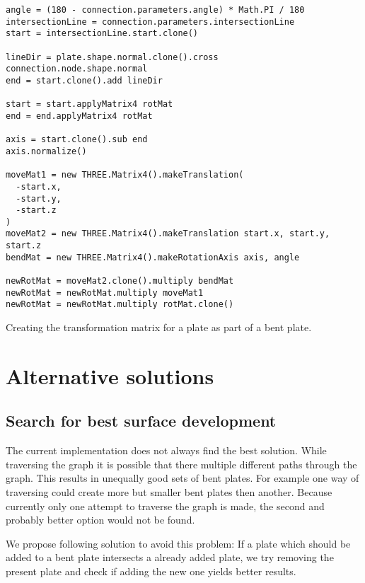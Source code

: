 \documentclass[../ClassicThesis.tex]{subfiles}
\begin{document}
\begin{listing}[ht]
\begin{verbatim}
angle = (180 - connection.parameters.angle) * Math.PI / 180
intersectionLine = connection.parameters.intersectionLine
start = intersectionLine.start.clone()

lineDir = plate.shape.normal.clone().cross connection.node.shape.normal
end = start.clone().add lineDir

start = start.applyMatrix4 rotMat
end = end.applyMatrix4 rotMat

axis = start.clone().sub end
axis.normalize()

moveMat1 = new THREE.Matrix4().makeTranslation(
  -start.x,
  -start.y,
  -start.z
)
moveMat2 = new THREE.Matrix4().makeTranslation start.x, start.y, start.z
bendMat = new THREE.Matrix4().makeRotationAxis axis, angle

newRotMat = moveMat2.clone().multiply bendMat
newRotMat = newRotMat.multiply moveMat1
newRotMat = newRotMat.multiply rotMat.clone()
\end{verbatim}
\caption{Creating the transformation matrix for a plate as part of a bent plate.}
\label{lst:bend-matrix}
\end{listing}

\section{Alternative solutions}

\subsection{Search for best surface development}

The current implementation does not always find the best solution. While traversing the graph it is possible that there multiple different paths through the graph. This results in unequally good sets of bent plates. For example one way of traversing could create more but smaller bent plates then another.
Because currently only one attempt to traverse the graph is made, the second and probably better option would not be found.

We propose following solution to avoid this problem: If a plate which should be added to a bent plate intersects a already added plate, we try removing the present plate and check if adding the new one yields better results.
\end{document}
